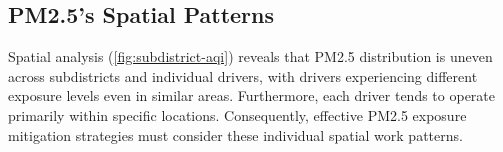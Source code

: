 
\subsection{PM2.5's Spatial Patterns}

Spatial analysis (\autoref{fig:subdistrict-aqi}) reveals that PM2.5 distribution is uneven across subdistricts and individual drivers, with drivers experiencing different exposure levels even in similar areas.
Furthermore, each driver tends to operate primarily within specific locations.
Consequently, effective PM2.5 exposure mitigation strategies must consider these individual spatial work patterns.



